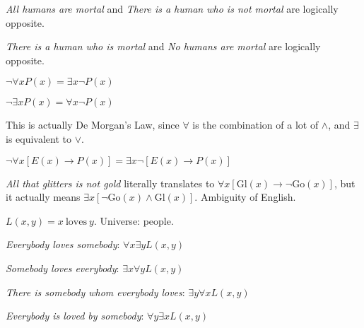 \begin{ex}

\textit{All humans are mortal} and \textit{There is a human who is not mortal} are logically opposite.

\textit{There is a human who is mortal} and \textit{No humans are mortal} are logically opposite.

\end{ex}

$\lnot \forall x P(x) = \exists x \lnot P(x)$

$\lnot \exists x P(x) = \forall x \lnot P(x)$

\begin{remark}

This is actually De Morgan's Law, since $\forall$ is the combination of a lot of $\land$, and $\exists$ is equivalent to $\lor$.

\end{remark}

\begin{ex}

$\lnot \forall x [ E(x) \rightarrow P(x) ] = \exists x \lnot [ E(x) \rightarrow P(x) ]$

\end{ex}

\begin{ex}

\textit{All that glitters is not gold} literally translates to $\forall x [ \text{Gl}(x) \rightarrow \lnot \text{Go}(x) ]$, but it actually means $\exists x [ \lnot \text{Go}(x) \land \text{Gl}(x) ]$. Ambiguity of English.

\end{ex}

\begin{ex}

$L(x, y) = x\ \mathrm{loves}\ y$. Universe: people.

\textit{Everybody loves somebody}: $\forall x \exists y L(x, y)$

\textit{Somebody loves everybody}: $\exists x \forall y L(x, y)$

\textit{There is somebody whom everybody loves}: $\exists y \forall x L(x, y)$

\textit{Everybody is loved by somebody}: $\forall y \exists x L(x, y)$

\end{ex}

